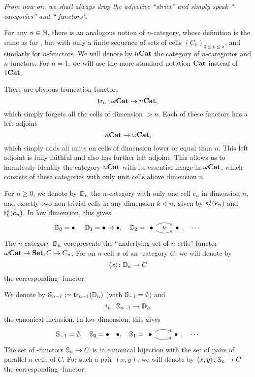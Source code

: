 \documentclass{amsart}
\newcommand{\src}[1]{\source{} #1}
\newcommand{\tgt}[1]{\target{} #1}
\begin{document}
\emph{ From now on, we shall always drop the adjective
  ``strict'' and simply speak ``\oo\nbd-categories'' and
  ``\oo\nbd-functors''.}
\begin{paragr}
  For any $n \in \mathbb N$, there is an analogous notion of
  $n$\nbd-category, whose definition is the same as for \oo, but
  with only a finite sequence of sets of cells
  $(C_k)_{0 \leq k \leq n}$,
  and similarly for $n$\nbd-functors. We will denote by ${n}\mathbf{Cat}$ the
  category of $n$\nbd-categories and $n$\nbd-functors. For $n=1$, we
  will use the more standard notation $\mathbf{Cat}$ instead of ${1}\mathbf{Cat}$.

  There are obvious truncation functors
  \[
    \mathsf{tr}_{n} \colon {\omega}\mathbf{Cat} \to {n}\mathbf{Cat},
  \]
  which simply forgets all the cells of dimension $> n$. Each of these
  functors has a left adjoint
  \[
    {n}\mathbf{Cat} \to {\omega}\mathbf{Cat},
  \]
  which simply adds all units on cells of dimension lower or equal
  than $n$. This left adjoint is fully faithful and also has further
  left adjoint. This allows us to harmlessly identify the category
  ${n}\mathbf{Cat}$ with its essential image in ${\omega}\mathbf{Cat}$, which consists of
  these categories with only unit cells above dimension $n$.
\end{paragr}
\begin{paragr}
  For $n\geq 0$, we denote by $\mathbb{D}_{n}$ the $n$\nbd-category with only
  one cell $e_n$ in dimension $n$, and exactly two non-trivial cells
  in any dimension $k<n$, given by $\src^n_k(e_n)$ and
  $\tgt^n_k(e_n)$. In low dimension, this gives
  \[
    \Dsk{0}=\bullet,\quad \Dsk{1}=\bullet \to \bullet,\quad
    \Dsk{2}=
    \begin{tikzcd}
      \bullet \ar[r,bend left,""{name=A,below}] \ar[r,bend
      right,""{name=B,above}] & \bullet
      \ar[from=A,to=B,Rightarrow]
    \end{tikzcd}
    ,\quad \cdots
  \]
  The $n$\nbd-category $\mathbb{D}_{n}$ corepresents the ``underlying set of $n$\nbd-cells'' functor ${\omega}\mathbf{Cat} \to \mathbf{Set}, C
  \mapsto C_n$. For an $n$\nbd-cell $x$ of an \oo\nbd-category $C$, we
  will denote by 
  \[
    \langle x \rangle \colon \mathbb{D}_{n} \to C
  \]
  the corresponding \oo\nbd-functor.

  We denote by $\mathbb{S}_{n-1}:=\mathsf{tr}_{n-1}(\mathbb{D}_{n})$ (with $\mathbb{S}_{-1}=\emptyset$)
  and
  \[
    i_n \colon \mathbb{S}_{n-1} \to \mathbb{D}_{n}
  \]
  the canonical inclusion. In low dimension, this gives
  \[
    \Sph{-1}=\emptyset,\quad \Sph{0}=\bullet \quad \bullet,\quad
    \Sph{1}=
    \begin{tikzcd}
      \bullet \ar[r,bend left,""{name=A,below}] \ar[r,bend
      right,""{name=B,above}] & \bullet
    \end{tikzcd}
    ,\quad \cdots
  \]
  The set of \oo\nbd-functors $\mathbb{S}_{n} \to C$ is in canonical
  bijection with the set of pairs of parallel $n$\nbd-cells of
  $C$. For such a pair $(x,y)$, we will denote by $\langle x,y
  \rangle\colon \mathbb{S}_{n}\to C$ the corresponding \oo\nbd-functor.
\end{paragr}
\end{document}
